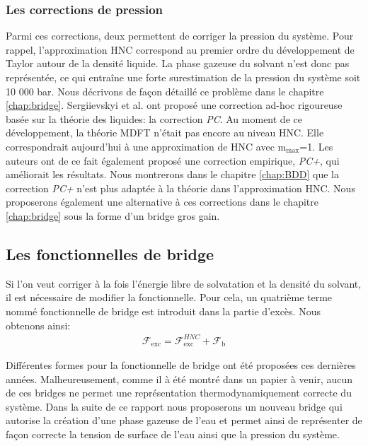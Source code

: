 \subsubsection{Les corrections de pression}
Parmi ces corrections, deux permettent de corriger la pression du système. Pour rappel, l'approximation HNC correspond au premier ordre du développement de Taylor autour de la densité liquide. La phase gazeuse du solvant n'est donc pas représentée, ce qui entraîne une forte surestimation de la pression du système soit 10 000 bar. Nous décrivons de façon détaillé ce problème dans le chapitre \ref{chap:bridge}. Sergiievskyi et al. \cite{sergiievskyi_solvation_2015,sergiievskyi_pressure_2015} ont proposé une correction ad-hoc rigoureuse basée sur la théorie des liquides: la correction \textit{PC}. Au moment de ce développement, la théorie MDFT n'était pas encore au niveau HNC. Elle correspondrait aujourd'hui à une approximation de HNC avec $\mathrm{m}_\mathrm{max}$=1. Les auteurs ont de ce fait également proposé une correction empirique, \textit{PC+}, qui améliorait les résultats\cite{misin_salting-out_2016, misin_hydration_2016, misin_communication:_2015}. Nous montrerons dans le chapitre \ref{chap:BDD} que la correction \textit{PC+} n'est plus adaptée à la théorie dans l'approximation HNC. Nous proposerons également une alternative à ces corrections dans le chapitre \ref{chap:bridge} sous la forme d'un bridge gros gain.




\subsection{Les fonctionnelles de bridge}
Si l'on veut corriger à la fois l'énergie libre de solvatation et la densité du solvant, il est nécessaire de modifier la fonctionnelle. Pour cela, un quatrième terme nommé fonctionnelle de bridge est introduit dans la partie d'excès. Nous obtenons ainsi:
\begin{eqnarray}
\mathcal{F}_\mathrm{exc} = \mathcal{F}_\mathrm{exc}^{HNC} + \mathcal{F}_\mathrm{b}
\end{eqnarray}

Différentes formes pour la fonctionnelle de bridge ont été proposées ces dernières années\cite{levesque_scalar_2012,jeanmairet_molecular_2013,jeanmairet_molecular_2015}. Malheureusement, comme il à été montré dans un papier à venir, aucun de ces bridges ne permet une représentation thermodynamiquement correcte du système. Dans la suite de ce rapport nous proposerons un nouveau bridge qui autorise la création d'une phase gazeuse de l'eau et permet ainsi de représenter de façon correcte la tension de surface de l'eau ainsi que la pression du système.



